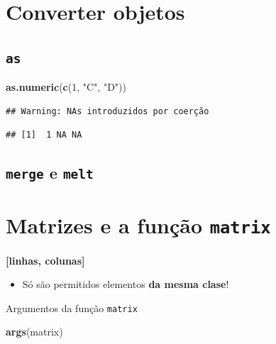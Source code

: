 \documentclass[]{book}
\newenvironment{Shaded}{\begin{snugshade}}{\end{snugshade}}
\newcommand{\KeywordTok}[1]{\textcolor[rgb]{0.13,0.29,0.53}{\textbf{#1}}}
\newcommand{\DecValTok}[1]{\textcolor[rgb]{0.00,0.00,0.81}{#1}}
\newcommand{\StringTok}[1]{\textcolor[rgb]{0.31,0.60,0.02}{#1}}
\newcommand{\NormalTok}[1]{#1}
\providecommand{\tightlist}{%
  \setlength{\itemsep}{0pt}\setlength{\parskip}{0pt}}
\begin{document}
\section{Converter objetos}\label{converter-objetos}

\subsection{\texorpdfstring{\texttt{as}}{as}}\label{as}

\begin{Shaded}
\begin{Highlighting}[]
\KeywordTok{as.numeric}\NormalTok{(}\KeywordTok{c}\NormalTok{(}\DecValTok{1}\NormalTok{, }\StringTok{"C"}\NormalTok{, }\StringTok{"D"}\NormalTok{))}
\end{Highlighting}
\end{Shaded}

\begin{verbatim}
## Warning: NAs introduzidos por coerção
\end{verbatim}

\begin{verbatim}
## [1]  1 NA NA
\end{verbatim}

\hypertarget{convert_df}{\subsection{\texorpdfstring{\texttt{merge} e
\texttt{melt}}{merge e melt}}\label{convert_df}}

\section{\texorpdfstring{Matrizes e a função
\texttt{matrix}}{Matrizes e a função matrix}}\label{matrizes-e-a-funcao-matrix}

\textbf{{[}linhas, colunas{]}}

\begin{itemize}
\tightlist
\item
  Só são permitidos elementos \textbf{da mesma clase}!
\end{itemize}

Argumentos da função \texttt{matrix}

\begin{Shaded}
\begin{Highlighting}[]
\KeywordTok{args}\NormalTok{(matrix)}
\end{Highlighting}
\end{Shaded}
\end{document}
